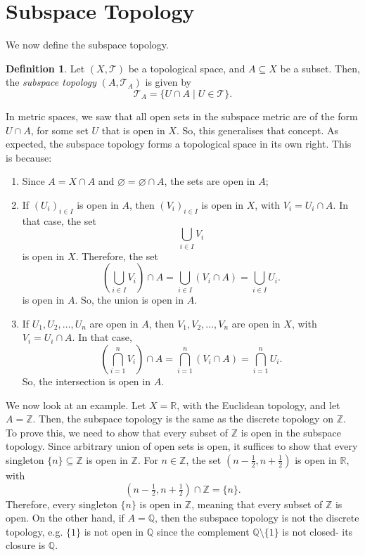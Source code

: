 \documentclass[a4paper, openany]{memoir}
\theoremstyle{definition}
\newtheorem{definition}{Definition}[section]
\theoremstyle{plain}
\begin{document}
\section{Subspace Topology}
We now define the subspace topology.
\begin{definition}
Let $(X, \mathcal{T})$ be a topological space, and $A \subseteq X$ be a subset. Then, the \emph{subspace topology} $(A, \mathcal{T}_A)$ is given by
\[\mathcal{T}_A = \{U \cap A \mid U \in \mathcal{T}\}.\]
\end{definition}
\noindent In metric spaces, we saw that all open sets in the subspace metric are of the form $U \cap A$, for some set $U$ that is open in $X$. So, this generalises that concept. As expected, the subspace topology forms a topological space in its own right. This is because:
\begin{enumerate}[label=\textbf{T\arabic*}.]
    \item Since $A = X \cap A$ and $\varnothing = \varnothing \cap A$, the sets are open in $A$;
    \item If $(U_i)_{i \in I}$ is open in $A$, then $(V_i)_{i \in I}$ is open in $X$, with $V_i = U_i \cap A$. In that case, the set
    \[\bigcup_{i \in I} V_i\]
    is open in $X$. Therefore, the set
    \[\left(\bigcup_{i \in I} V_i \right) \cap A = \bigcup_{i \in I} (V_i \cap A) = \bigcup_{i \in I} U_i.\]
    is open in $A$. So, the union is open in $A$.
    \item If $U_1, U_2, \dots, U_n$ are open in $A$, then $V_1, V_2, \dots, V_n$ are open in $X$, with $V_i = U_i \cap A$. In that case,
    \[\left(\bigcap_{i = 1}^n V_i \right) \cap A = \bigcap_{i=1}^n (V_i \cap A) = \bigcap_{i=1}^n U_i.\]
    So, the intersection is open in $A$.
\end{enumerate}

We now look at an example. Let $X = \mathbb{R}$, with the Euclidean topology, and let $A = \mathbb{Z}$. Then, the subspace topology is the same as the discrete topology on $\mathbb{Z}$. To prove this, we need to show that every subset of $\mathbb{Z}$ is open in the subspace topology. Since arbitrary union of open sets is open, it suffices to show that every singleton $\{n\} \subseteq \mathbb{Z}$ is open in $\mathbb{Z}$. For $n \in \mathbb{Z}$, the set $(n - \frac{1}{2}, n + \frac{1}{2})$ is open in $\mathbb{R}$, with 
\[(n - \tfrac{1}{2}, n + \tfrac{1}{2}) \cap \mathbb{Z} = \{n\}.\]
Therefore, every singleton $\{n\}$ is open in $\mathbb{Z}$, meaning that every subset of $\mathbb{Z}$ is open. On the other hand, if $A = \mathbb{Q}$, then the subspace topology is not the discrete topology, e.g. $\{1\}$ is not open in $\mathbb{Q}$ since the complement $\mathbb{Q} \setminus \{1\}$ is not closed- its closure is $\mathbb{Q}$.
\end{document}
